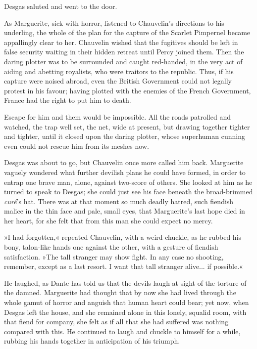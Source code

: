 Desgas saluted and went to the door.

As Marguerite, sick with horror, listened to Chauvelin's directions to his underling, the whole of the plan for the capture of the Scarlet Pimpernel became appallingly clear to her. Chauvelin wished that the fugitives should be left in false security waiting in their hidden retreat until Percy joined them. Then the daring plotter was to be surrounded and caught red-handed, in the very act of aiding and abetting royalists, who were traitors to the republic. Thus, if his capture were noised abroad, even the British Government could not legally protest in his favour; having plotted with the enemies of the French Government, France had the right to put him to death.

Escape for him and them would be impossible. All the roads patrolled and watched, the trap well set, the net, wide at present, but drawing together tighter and tighter, until it closed upon the daring plotter, whose superhuman cunning even could not rescue him from its meshes now.

Desgas was about to go, but Chauvelin once more called him back. Marguerite vaguely wondered what further devilish plans he could have formed, in order to entrap one brave man, alone, against two-score of others. She looked at him as he turned to speak to Desgas; she could just see his face beneath the broad-brimmed \textit{curé}'s hat. There was at that moment so much deadly hatred, such fiendish malice in the thin face and pale, small eyes, that Marguerite's last hope died in her heart, for she felt that from this man she could expect no mercy.

»I had forgotten,« repeated Chauvelin, with a weird chuckle, as he rubbed his bony, talon-like hands one against the other, with a gesture of fiendish satisfaction. »The tall stranger may show fight. In any case no shooting, remember, except as a last resort. I want that tall stranger alive... if possible.«

He laughed, as Dante has told us that the devils laugh at sight of the torture of the damned. Marguerite had thought that by now she had lived through the whole gamut of horror and anguish that human heart could bear; yet now, when Desgas left the house, and she remained alone in this lonely, squalid room, with that fiend for company, she felt as if all that she had suffered was nothing compared with this. He continued to laugh and chuckle to himself for a while, rubbing his hands together in anticipation of his triumph.


